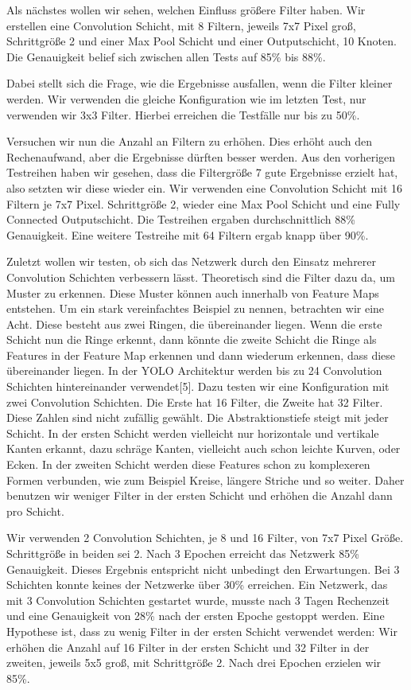 \documentclass[12pt]{article}
\begin{document}
Als nächstes wollen wir sehen, welchen Einfluss größere Filter haben. Wir erstellen eine Convolution Schicht, mit 8 Filtern, jeweils 7x7 Pixel groß, Schrittgröße 2 und einer Max Pool Schicht und einer Outputschicht, 10 Knoten.
Die Genauigkeit belief sich zwischen allen Tests auf 85\% bis 88\%. 
	
Dabei stellt sich die Frage, wie die Ergebnisse ausfallen, wenn die Filter kleiner werden. Wir verwenden die gleiche Konfiguration wie im letzten Test, nur verwenden wir 3x3 Filter.
Hierbei erreichen die Testfälle nur bis zu 50\%. 

Versuchen wir nun die Anzahl an Filtern zu erhöhen. Dies erhöht auch den Rechenaufwand, aber die Ergebnisse dürften besser werden. Aus den vorherigen Testreihen haben wir gesehen, dass die Filtergröße 7 gute Ergebnisse erzielt hat, also setzten wir diese wieder ein.
Wir verwenden eine Convolution Schicht mit 16 Filtern je 7x7 Pixel. Schrittgröße 2, wieder eine Max Pool Schicht und eine Fully Connected Outputschicht. Die Testreihen ergaben durchschnittlich 88\% Genauigkeit. Eine weitere Testreihe mit 64 Filtern ergab knapp über 90\%.

Zuletzt wollen wir testen, ob sich das Netzwerk durch den Einsatz mehrerer Convolution Schichten verbessern lässt. Theoretisch sind die Filter dazu da, um Muster zu erkennen. Diese Muster können auch innerhalb von Feature Maps entstehen. Um ein stark vereinfachtes Beispiel zu nennen, betrachten wir eine Acht. Diese besteht aus zwei Ringen, die übereinander liegen. Wenn die erste Schicht nun die Ringe erkennt, dann könnte die zweite Schicht die Ringe als Features in der Feature Map erkennen und dann wiederum erkennen, dass diese übereinander liegen. In der YOLO Architektur werden bis zu 24 Convolution Schichten hintereinander verwendet[5]. Dazu testen wir eine Konfiguration mit zwei Convolution Schichten. Die Erste hat 16 Filter, die Zweite hat 32 Filter. Diese Zahlen sind nicht zufällig gewählt. Die Abstraktionstiefe steigt mit jeder Schicht. In der ersten Schicht werden vielleicht nur horizontale und vertikale Kanten erkannt, dazu schräge Kanten, vielleicht auch schon leichte Kurven, oder Ecken. In der zweiten Schicht werden diese Features schon zu komplexeren Formen verbunden, wie zum Beispiel Kreise, längere Striche und so weiter.
Daher benutzen wir weniger Filter in der ersten Schicht und erhöhen die Anzahl dann pro Schicht.

Wir verwenden 2 Convolution Schichten, je 8 und 16 Filter, von 7x7 Pixel Größe. Schrittgröße in beiden sei 2. Nach 3 Epochen erreicht das Netzwerk 85\% Genauigkeit. Dieses Ergebnis entspricht nicht unbedingt den Erwartungen. 
Bei 3 Schichten konnte keines der Netzwerke über 30\% erreichen. Ein Netzwerk, das mit 3 Convolution Schichten gestartet wurde, musste nach 3 Tagen Rechenzeit und eine Genauigkeit von 28\% nach der ersten Epoche gestoppt werden.
Eine Hypothese ist, dass zu wenig Filter in der ersten Schicht verwendet werden:
Wir erhöhen die Anzahl auf 16 Filter in der ersten Schicht und 32 Filter in der zweiten, jeweils 5x5 groß, mit Schrittgröße 2. Nach drei Epochen erzielen wir 85\%.
\end{document}
